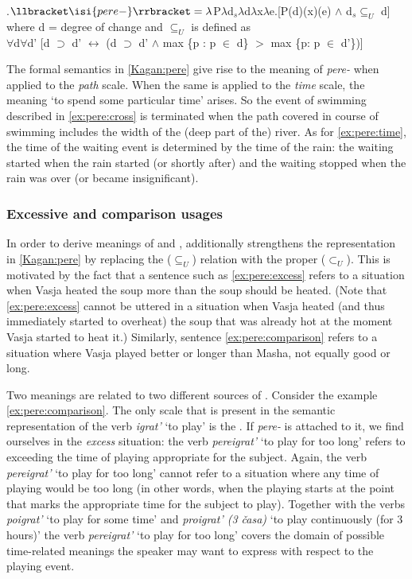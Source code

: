 \ex.\label{Kagan:pere}$\llbracket \isi{pere-} \rrbracket = \lambda$P$\lambda$d$_s\lambda$d$\lambda$x$\lambda$e.[P(d)(x)(e) $\wedge$ d$_s \subseteq _U$ d]\\
where d = degree of change \citep{KennedyLevin:02} and $\subseteq _U$ is defined as\\
$\forall$d$\forall$d' [d $\supset$ d' $\leftrightarrow$ (d $\supset$ d' $\wedge$ max \{p : p $\in$ d\} $>$ max \{p: p $\in$ d'\})]\\

The formal semantics in \ref{Kagan:pere} give rise to the  meaning of \textit{pere-} when applied to the \textit{path} scale. When the same is applied to the \textit{time} scale, the meaning `to spend some particular time' arises. So the event of swimming described in \ref{ex:pere:cross} is terminated when the path covered in course of swimming includes the width of the (deep part of the) river. As for \ref{ex:pere:time}, the time of the waiting event is determined by the time of the rain: the waiting started when the rain started (or shortly after) and the waiting stopped when the rain was over (or became insignificant).

\subsubsection{Excessive and comparison usages}
In order to derive meanings of  and , \citet[133]{Kagan:book} additionally strengthens the representation in \ref{Kagan:pere} by replacing the  ($\subseteq _U$) relation with the proper  ($\subset _U$). This is motivated by the fact that a sentence such as \ref{ex:pere:excess} refers to a situation when Vasja heated the soup more than the soup should be heated. (Note that \ref{ex:pere:excess} cannot be uttered in a situation when Vasja heated (and thus immediately started to overheat) the soup that was already hot at the moment Vasja started to heat it.) Similarly, sentence \ref{ex:pere:comparison} refers to a situation where Vasja played better or longer than Masha, not equally good or long.

Two meanings are related to two different sources of . Consider the example \ref{ex:pere:comparison}. The only scale that is present in the semantic representation of the verb \textit{igrat'} `to play' is the . If \textit{pere-} is attached to it, we find ourselves in the \textit{excess} situation: the verb \textit{pereigrat'} `to play for too long' refers to exceeding the time of playing appropriate for the subject. Again, the verb \textit{pereigrat'} `to play for too long' cannot refer to a situation where any time of playing would be too long (in other words, when the playing starts at the point that marks the appropriate time for the subject to play). Together with the verbs \textit{poigrat'} `to play for some time' and \textit{proigrat' (3 \v{c}asa)} `to play continuously (for 3 hours)' the verb \textit{pereigrat'} `to play for too long' covers the domain of possible time-related meanings the speaker may want to express with respect to the playing event.

